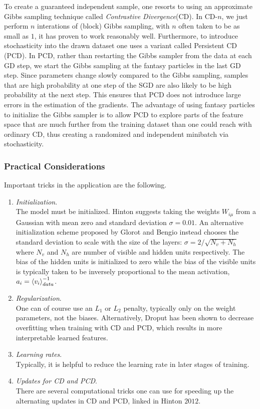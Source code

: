 To create a guaranteed independent sample, one resorts to using an approximate Gibbs sampling technique called \emph{Contrastive Divergence}(CD). In CD-$n$, we just perform $n$ interations of (block) Gibbs sampling, with $n$ often taken to be as small as $1$, it has proven to work reasonably well. Furthermore, to introduce stochasticity into the drawn dataset one uses a variant called Persistent CD (PCD). In PCD, rather than restarting the Gibbs sampler from the data at each GD step, we start the Gibbs sampling at the fantasy particles in the last GD step. Since parameters change slowly compared to the Gibbs sampling, samples that are high probability at one step of the SGD are also likely to be high probability at the next step. This ensures that PCD does not introduce large errors in the estimation of the gradients. The advantage of using fantasy particles to initialize the Gibbs sampler is to allow PCD to explore parts of the feature space that are much further from the training dataset than one could reach with ordinary CD, thus creating a randomized and independent minibatch via stochasticity.

\subsubsection{Practical Considerations}
\label{subsubsec:deepGenerativeTrainingPractical}
Important tricks in the application are the following.
\begin{enumerate}
	\item \emph{Initialization}.\\
	The model must be initialized. Hinton suggests taking the weights $W_{i\mu}$ from a Gaussian with mean zero and standard deviation $\sigma=0.01$. An alternative initialization scheme proposed by Glorot and Bengio instead chooses the standard deviation to scale with the size of the layers: $\sigma = 2/\sqrt{N_v+N_h}$ where $N_v$ and $N_h$ are number of visible and hidden units respectively. The bias of the hidden units is initialized to zero while the bias of the visible units is typically taken to be inversely proportional to the mean activation, $a_i=\expval{v_i}^{-1}_{data}$.
	\item \emph{Regularization}.\\
	One can of course use an $L_1$ or $L_2$ penalty, typically only on the weight parameters, not the biases. Alternatively, Droput has been shown to decrease overfitting when training with CD and PCD, which results in more interpretable learned features.
	\item  \emph{Learning rates}.\\
	Typically, it is helpful to reduce the learning rate in later stages of training.
	\item \emph{Updates for CD and PCD}.\\
	There are several computational tricks one can use for speeding up the alternating updates in CD and PCD, linked in Hinton $2012$.
\end{enumerate}




